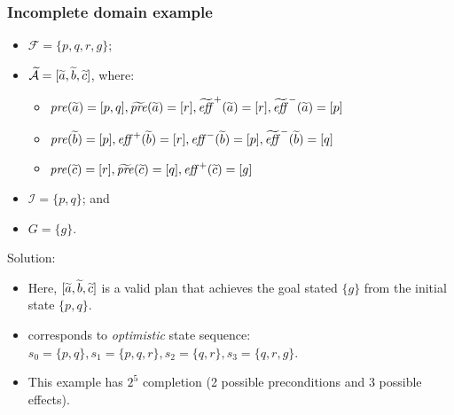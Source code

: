 \documentclass{beamer}
\newcommand{\todo}[1]{ {\color{red} #1} }
\begin{document}
\begin{frame}[c]\frametitle{Incomplete domain example}
\begin{itemize}
	\item $\mathcal{F} = \lbrace p,q,r,g \rbrace$;
	\item $\widetilde{\mathcal{\mathcal{A}}} = [ \widetilde{a},\widetilde{b},\widetilde{c} ]$, where:
	\begin{itemize}
		\item $\mathit{pre}(\widetilde{a}) = [ p,q ], \widetilde{\mathit{pre}}(\widetilde{a}) = [ r ], \widetilde{\mathit{eff}}^{+}(\widetilde{a}) = [ r ], \widetilde{\mathit{eff}}^{-}(\widetilde{a}) = [ p ]$
		\item $\mathit{pre}(\widetilde{b}) = [ p ], \mathit{eff}^{+}(\widetilde{b}) = [ r ], \mathit{eff}^{-}(\widetilde{b}) = [ p ], \widetilde{\mathit{eff}}^{-}(\widetilde{b}) = [ q ]$
		\item $\mathit{pre}(\widetilde{c}) = [ r ], \widetilde{\mathit{pre}}(\widetilde{c}) = [ q ], \mathit{eff}^{+}(\widetilde{c}) = [ g ]$
	\end{itemize}
	\item $\mathcal{I} = \lbrace p,q \rbrace$; and
	\item $G = \lbrace g \rbrace$.
\end{itemize}

Solution:
\begin{itemize}
	\item Here, $[\widetilde{a},\widetilde{b},\widetilde{c}]$ is a valid plan that achieves the goal stated $\lbrace g \rbrace$ from the initial state $\lbrace p,q \rbrace$.
	\item corresponds to  \textit{optimistic} state sequence:
	$s_{0} =  \lbrace p,q \rbrace, s_{1} = \lbrace p,q,r \rbrace, s_{2} = \lbrace q,r \rbrace, s_{3} = \lbrace q,r,g \rbrace$.
	\item This example has $2^{5}$ completion (2 possible preconditions and 3 possible effects).
\end{itemize}
\end{frame}

\end{document}
